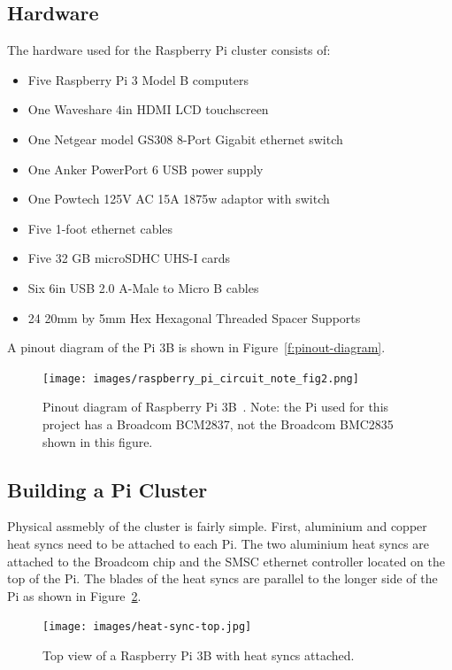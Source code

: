 \subsection{Hardware}

The hardware used for the Raspberry Pi cluster consists of:

\begin{itemize}
\item Five Raspberry Pi 3 Model B computers 
\item One Waveshare 4in HDMI LCD touchscreen
\item One Netgear model GS308 8-Port Gigabit ethernet switch
\item One Anker PowerPort 6 USB power supply
\item One Powtech 125V AC 15A 1875w adaptor with switch
\item Five 1-foot ethernet cables
\item Five 32 GB microSDHC UHS-I cards
\item Six 6in USB 2.0 A-Male to Micro B cables
\item 24 20mm by 5mm Hex Hexagonal Threaded Spacer Supports
\end{itemize}

A pinout diagram of the Pi 3B is shown in Figure~\ref{f:pinout-diagram}.

\begin{figure}[!ht]
  \centering\texttt{[image: images/raspberry\_pi\_circuit\_note\_fig2.png]} \caption{Pinout
  diagram of Raspberry Pi 3B~\cite{hid-sp18-419-pi-pinout}. Note: the
  Pi used for this project has a Broadcom BCM2837, not the Broadcom
  BMC2835 shown in this figure.}\label{f:pinout-digram}
\end{figure}

\subsection{Building a Pi Cluster}
  Physical assmebly of the cluster is fairly
simple. First, aluminium and copper heat syncs need to be attached to
each Pi. The two aluminium heat syncs are attached to the Broadcom
chip and the SMSC ethernet controller located on the top of the
Pi. The blades of the heat syncs are parallel to the longer side of
the Pi as shown in Figure~\ref{f:heat-sync-top}.

\begin{figure}[!ht]
  \centering\texttt{[image: images/heat-sync-top.jpg]} \caption{Top
  view of a Raspberry Pi 3B with heat syncs
  attached.}\label{f:heat-sync-top}
\end{figure}

